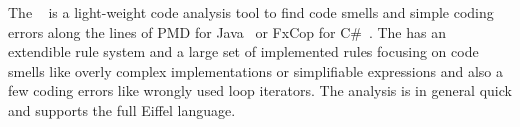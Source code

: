 \subsubsection{\Inspector}

The \Inspector~\cite{ZURFLUH14} is a light-weight code analysis tool to find code smells and simple coding errors along the lines of PMD for Java~\cite{PMD} or FxCop for C\#~\cite{FXCOP}. The \Inspector has an extendible rule system and a large set of implemented rules focusing on code smells like overly complex implementations or simplifiable expressions and also a few coding errors like wrongly used loop iterators. The analysis is in general quick and supports the full Eiffel language.


